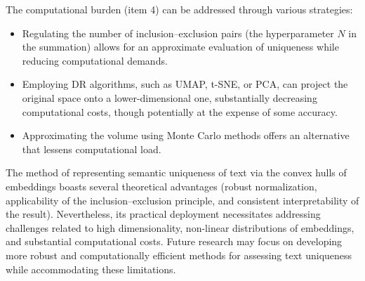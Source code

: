 The computational burden (item 4) can be addressed through various strategies:
\begin{itemize}
    \item Regulating the number of inclusion–exclusion pairs (the hyperparameter $N$ in the summation) allows for an approximate evaluation
    of uniqueness while reducing computational demands.
    \item Employing DR algorithms, such as UMAP, t-SNE, or PCA, can project the original space onto a lower-dimensional one,
    substantially decreasing computational costs, though potentially at the expense of some accuracy.
    \item Approximating the volume using Monte Carlo methods offers an alternative that lessens computational load.
\end{itemize}

The method of representing semantic uniqueness of text via the convex hulls of embeddings boasts several theoretical advantages (robust normalization,
applicability of the inclusion–exclusion principle, and consistent interpretability of the result). Nevertheless, its practical deployment necessitates
addressing challenges related to high dimensionality, non-linear distributions of embeddings, and substantial computational costs. Future research may
focus on developing more robust and computationally efficient methods for assessing text uniqueness while accommodating these limitations.